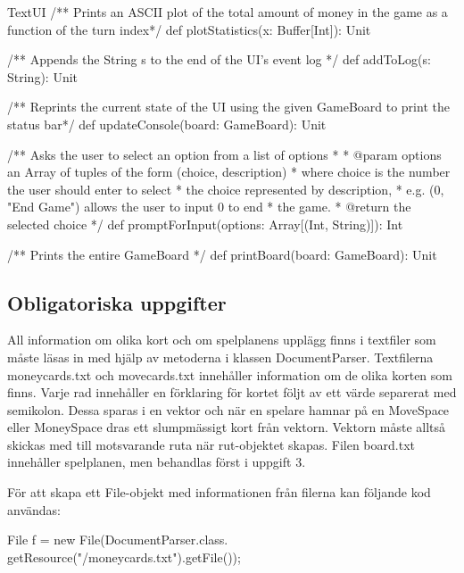 \begin{ScalaSpec}{TextUI}
   /** Prints an ASCII plot of the total amount 
	of money in the game as a function of the turn index*/
  def plotStatistics(x: Buffer[Int]): Unit

  /** Appends the String s to the end of the UI's event log */
  def addToLog(s: String): Unit 

  /** Reprints the current state of the UI using the given
	GameBoard to print the status bar*/
  def updateConsole(board: GameBoard): Unit 

 
  /** Asks the user to select an option from a list of options
    *
    * @param options an Array of tuples of the form (choice, description)
    *                where choice is the number the user should enter to select 
    *                the choice represented by description,
    *                e.g. (0,  "End Game") allows the user to input 0 to end 
    *                the game.
    * @return        the selected choice
    */
  def promptForInput(options: Array[(Int, String)]): Int 

  /** Prints the entire GameBoard */
  def printBoard(board: GameBoard): Unit 

 
\end{ScalaSpec}


\subsection{Obligatoriska uppgifter}

\Task All information om olika kort och om spelplanens upplägg finns i textfiler som måste läsas in med hjälp av metoderna i klassen DocumentParser. 
Textfilerna moneycards.txt och movecards.txt innehåller information om de olika korten som finns.
Varje rad innehåller en förklaring för kortet följt av ett värde separerat med semikolon. Dessa sparas i en vektor och när en spelare hamnar på en MoveSpace eller MoneySpace dras ett slumpmässigt kort från vektorn. Vektorn måste alltså skickas med till motsvarande ruta när rut-objektet skapas.
Filen board.txt innehåller spelplanen, men behandlas först i uppgift 3.

För att skapa ett File-objekt med informationen från filerna kan följande kod användas:
\newline
\newline
\begin{Code}
File f = new File(DocumentParser.class.
        getResource("/moneycards.txt").getFile());
\end{Code}

